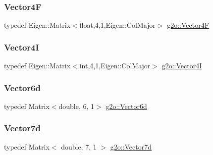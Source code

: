 \mbox{\label{namespaceg2o_aebecb51a41734608aeea377a31ee88c6}} 
\subsubsection{\texorpdfstring{Vector4F}{Vector4F}}
{\footnotesize\ttfamily typedef Eigen\+::\+Matrix$<$float,4,1,Eigen\+::\+Col\+Major$>$ \mbox{\hyperlink{namespaceg2o_aebecb51a41734608aeea377a31ee88c6}{g2o\+::\+Vector4F}}}

\mbox{\label{namespaceg2o_a7a368c33c15d52cca214b779a5fb32ce}} 
\subsubsection{\texorpdfstring{Vector4I}{Vector4I}}
{\footnotesize\ttfamily typedef Eigen\+::\+Matrix$<$int,4,1,Eigen\+::\+Col\+Major$>$ \mbox{\hyperlink{namespaceg2o_a7a368c33c15d52cca214b779a5fb32ce}{g2o\+::\+Vector4I}}}

\mbox{\label{namespaceg2o_a3bc8a4fbac86f158d548be81af2f929b}} 
\subsubsection{\texorpdfstring{Vector6d}{Vector6d}}
{\footnotesize\ttfamily typedef Matrix$<$double, 6, 1$>$ \mbox{\hyperlink{namespaceg2o_a3bc8a4fbac86f158d548be81af2f929b}{g2o\+::\+Vector6d}}}

\mbox{\label{namespaceg2o_a4740ec41130f2ecc628c81f71261c8de}} 
\subsubsection{\texorpdfstring{Vector7d}{Vector7d}}
{\footnotesize\ttfamily typedef Matrix$<$ double, 7, 1 $>$ \mbox{\hyperlink{namespaceg2o_a4740ec41130f2ecc628c81f71261c8de}{g2o\+::\+Vector7d}}}

\mbox{\label{namespaceg2o_ab67b68e8bc395b2085174937de1a634d}} 
